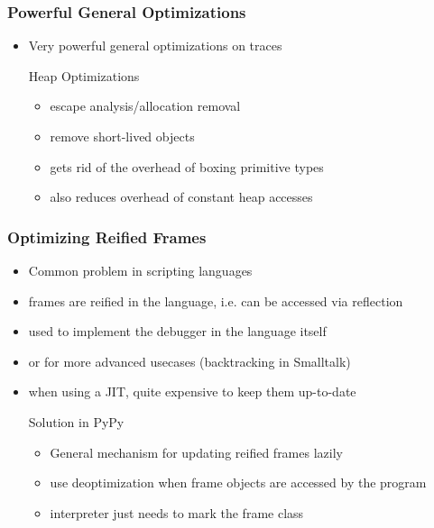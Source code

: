 \documentclass[utf8x]{beamer}
\begin{document}
\begin{frame}[label=optimizations]
  \frametitle{Powerful General Optimizations}
  \begin{itemize}
      \item Very powerful general optimizations on traces
      \pause
      \begin{block}{Heap Optimizations}
        \begin{itemize}
            \item escape analysis/allocation removal
            \item remove short-lived objects
            \item gets rid of the overhead of boxing primitive types
            \item also reduces overhead of constant heap accesses
        \end{itemize}
      \end{block}
  \end{itemize}
\end{frame}

\begin{frame}[label=virtualizables]
  \frametitle{Optimizing Reified Frames}
  \begin{itemize}
      \item Common problem in scripting languages
      \item frames are reified in the language, i.e. can be accessed via reflection
      \item used to implement the debugger in the language itself
      \item or for more advanced usecases (backtracking in Smalltalk)
      \item when using a JIT, quite expensive to keep them up-to-date
      \pause
      \begin{block}{Solution in PyPy}
          \begin{itemize}
              \item General mechanism for updating reified frames lazily
              \item use deoptimization when frame objects are accessed by the program
              \item interpreter just needs to mark the frame class
          \end{itemize}
      \end{block}
  \end{itemize}
\end{frame}
\end{document}
